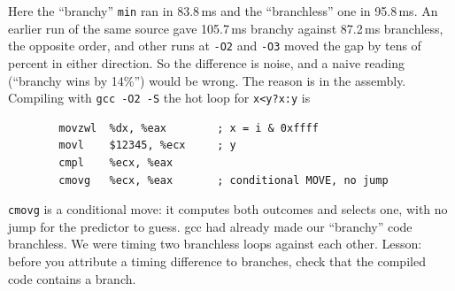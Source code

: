 \begin{example}
Here the ``branchy'' \texttt{min} ran in 83.8\,ms and the
``branchless'' one in 95.8\,ms. An earlier run of the same source gave
105.7\,ms branchy against 87.2\,ms branchless, the opposite order,
and other runs at \texttt{-O2} and \texttt{-O3} moved the gap by
tens of percent in either direction. So the difference is noise, and
a naive reading (``branchy wins by 14\%'') would be wrong. The reason is in the assembly. Compiling with
\texttt{gcc -O2 -S} the hot loop for \texttt{x<y?x:y} is

{\scriptsize
\begin{verbatim}
        movzwl  %dx, %eax        ; x = i & 0xffff
        movl    $12345, %ecx     ; y
        cmpl    %ecx, %eax
        cmovg   %ecx, %eax       ; conditional MOVE, no jump
\end{verbatim}
}
\texttt{cmovg} is a conditional move: it computes both outcomes
and selects one, with no jump for the predictor to guess. gcc
had already made our ``branchy'' code branchless. We were timing two
branchless loops against each other. Lesson: before you attribute a
timing difference to branches, check that the compiled code contains
a branch.
\end{example}




